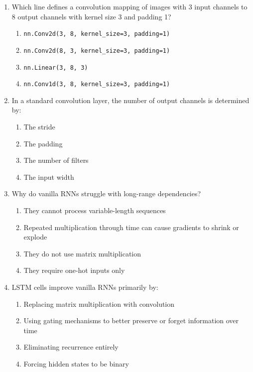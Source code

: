 \documentclass[11pt]{article}
\newcommand{\cmark}{\ding{51}}
\begin{document}
\begin{enumerate}[leftmargin=*]
\item Which line defines a convolution mapping of images with 3 input channels to 8 output channels with kernel size 3 and padding 1?

\begin{enumerate}[label=\Alph*.]
    \item \texttt{nn.Conv2d(3, 8, kernel\_size=3, padding=1)} \cmark
    \item \texttt{nn.Conv2d(8, 3, kernel\_size=3, padding=1)}
    \item \texttt{nn.Linear(3, 8, 3)}
    \item \texttt{nn.Conv1d(3, 8, kernel\_size=3, padding=1)}
\end{enumerate}

\item In a standard convolution layer, the number of output channels is determined by:

\begin{enumerate}[label=\Alph*.]
    \item The stride
    \item The padding
    \item The number of filters \cmark
    \item The input width
\end{enumerate}

\item Why do vanilla RNNs struggle with long-range dependencies?

\begin{enumerate}[label=\Alph*.]
    \item They cannot process variable-length sequences
    \item Repeated multiplication through time can cause gradients to shrink or explode \cmark
    \item They do not use matrix multiplication
    \item They require one-hot inputs only
\end{enumerate}

\item LSTM cells improve vanilla RNNs primarily by:

\begin{enumerate}[label=\Alph*.]
    \item Replacing matrix multiplication with convolution
    \item Using gating mechanisms to better preserve or forget information over time \cmark
    \item Eliminating recurrence entirely
    \item Forcing hidden states to be binary
\end{enumerate}


\end{enumerate}
\end{document}
